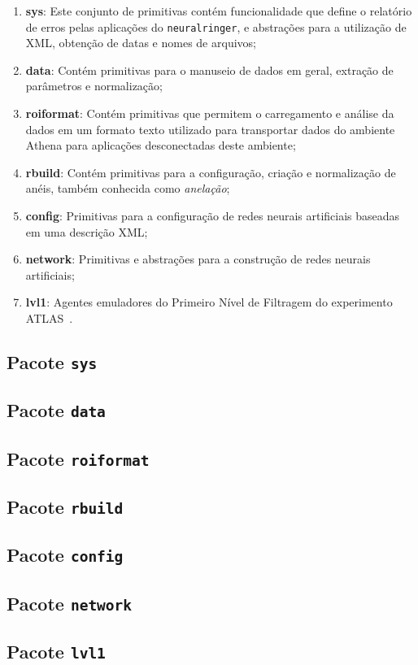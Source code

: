 \begin{enumerate}
\item \textbf{sys}: Este conjunto de primitivas contém funcionalidade que
define o relatório de erros pelas aplicações do \texttt{neuralringer}, e
abstrações para a utilização de  XML, obtenção de datas e nomes de
arquivos;
\item \textbf{data}: Contém primitivas para o manuseio de dados em geral,
extração de parâmetros e normalização;
\item \textbf{roiformat}: Contém primitivas que permitem o carregamento e
análise da dados em um formato texto utilizado para transportar dados do
ambiente Athena para aplicações desconectadas deste ambiente;
\item \textbf{rbuild}: Contém primitivas para a configuração, criação e
normalização de anéis, também conhecida como \textit{anelação};
\item \textbf{config}: Primitivas para a configuração de redes neurais
artificiais baseadas em uma descrição XML;
\item \textbf{network}: Primitivas e abstrações para a construção de redes
neurais artificiais;
\item \textbf{lvl1}: Agentes emuladores do Primeiro Nível de Filtragem do
experimento ATLAS~\cite{l1-tdr}.
\end{enumerate}

\subsection{Pacote \texttt{sys}}

\subsection{Pacote \texttt{data}}

\subsection{Pacote \texttt{roiformat}}

\subsection{Pacote \texttt{rbuild}}

\subsection{Pacote \texttt{config}}

\subsection{Pacote \texttt{network}}

\subsection{Pacote \texttt{lvl1}}

